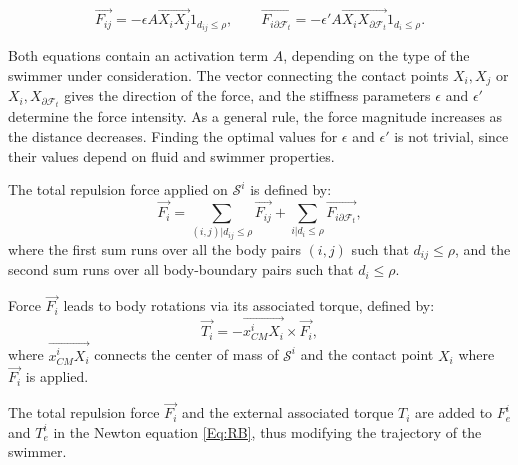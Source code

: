 \documentclass[graybox]{svmult}
\newcommand{\Fluid}{\mathcal{F}} %
\newcommand{\Solid}{\mathcal{S}} %
\begin{document}
$$
\overrightarrow{F_{ij}} = - \epsilon A  \overrightarrow{X_i X_j }  1_{d_{ij} \leq \rho}, \qquad
\overrightarrow{F_{i \partial \Fluid_t}} = - \epsilon' A \overrightarrow{X_i X_{\partial \Fluid_t} }  1_{d_{i} \leq \rho}.
$$

Both equations contain an activation term $A$, depending on the type of the swimmer under consideration.  The vector connecting the contact points $X_i, X_j$ or $X_i, X_{\partial \Fluid_t}$
gives the direction of the force, and the stiffness parameters $\epsilon$ and $\epsilon'$ determine the force intensity. As a general rule, the force magnitude increases as the distance decreases. Finding the optimal values for $\epsilon$ and $\epsilon'$ is not trivial, since their values depend on fluid and swimmer properties.   

The total repulsion force applied on $\Solid^i$ is defined by:
$$
\overrightarrow{F_i} = \sum_{(i,j)|d_{ij} \leq \rho} \overrightarrow{F_{ij}} +  \sum_{i | d_i \leq \rho} \overrightarrow{F_{i \partial \Fluid_t}},
$$
where the first sum runs over all the body pairs $(i,j)$ such that $d_{ij}\le \rho$, and the second sum runs over all body-boundary pairs such that $d_{i}\le \rho$.

Force $\overrightarrow{F_i}$ leads to body rotations via its associated torque, defined by: 
$$
\overrightarrow{T_i} = - \overrightarrow{x_{CM}^i X_i} \times \overrightarrow{F_i},
$$
where $\overrightarrow{x_{CM}^i X_i}$ connects the center of mass of $\Solid^i$ and the contact point $X_i$ where $\overrightarrow{F_i}$ is applied.

The total repulsion force $\overrightarrow{F_i}$ and the external associated torque $T_i$ are added to  $F_e^i$ and $T_e^i$ in the Newton equation \eqref{Eq:RB}, thus modifying the trajectory of the swimmer.  

\end{document}
